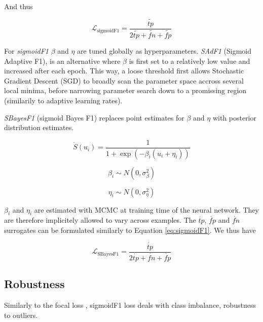 And thus

\begin{equation}
\mathcal{L}_{\text {sigmoidF1}}= \frac{\widetilde{tp}}{2 \widetilde{tp}+ \widetilde{fn}+ \widetilde{fp}}
\end{equation}

 \cite{smoothHinge}

For \emph{sigmoidF1} \(\beta\) and \(\eta\) are tuned globally as hyperparameters. \emph{SAdF1} (Sigmoid Adaptive F1), is an alternative where \(\beta\) is first set to a relatively low value and increased after each epoch. This way, a loose threshold first allows Stochastic Gradient Descent (SGD) to broadly scan the parameter space accross several local minima, before narrowing parameter search down to a promissing region (similarily to adaptive learning rates).

\emph{SBayesF1} (sigmoid Bayes F1) replaces point estimates for \(\beta\) and \(\eta\) with posterior distribution estimates. 

\begin{equation}
\dot{S}(u_i) = \frac{1}{1+\exp (-\beta_i (u_i + \eta_i))}
\end{equation}

$$ \beta_i \sim N(0, \sigma^{2}_{\beta}) $$

$$ \eta_i \sim N(0, \sigma^{2}_{\eta}) $$

\(\beta_i\) and \(\eta_i\) are estimated with MCMC at training time of the neural network. They are therefore implicitely allowed to vary across examples. The \(\dot{tp}\), \(\dot{fp}\) and \(\dot{fn}\) surrogates can be formulated similarly to Equation \ref{eq:sigmoidF1}. We thus have

\begin{equation}
\mathcal{L}_{\text {SBayesF1}}= \frac{\dot{tp}}{2 \dot{tp}+ \dot{fn}+ \dot{fp}}
\end{equation}





\subsection{Robustness}
\label{sec:org6c7c3d0}


Similarly to the focal loss \cite{focalLoss}, sigmoidF1 loss deals with class imbalance, robustness to outliers.

